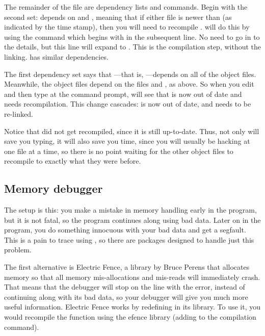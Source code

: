 \documentclass[12pt]{article}
\makeatletter
\def\ind#1{\index{#1}#1}
\def\cind#1{\index{#1@\ci{#1}}\ci{#1}}
\makeatother
\begin{document}
The remainder of the file are dependency lists and commands. Begin
with the second set:  depends on  and , meaning that if either file is newer than 
(as indicated by the time stamp), then you will need to recompile .  will do this by using the command which begins with
 in the subsequent line. No need to go in to the details, but
this line will expand to . This
is the compilation step, without the linking.  has similar
dependencies.

The first dependency set says that ---that is, ---depends on all of the object files. Meanwhile, the object files
depend on the  files and , as above. So when
you edit  and then type  at the command prompt,
 will see that  is now out of date and needs
recompilation. This change cascades:  is now out of date,
and needs to be re-linked.

Notice that  did not get recompiled, since it is still
up-to-date. Thus, not only will  save you typing, it will also
save you time, since you will usually be hacking at one file at a time,
so there is no point waiting for the other object files to recompile
to exactly what they were before. 

\subsection{Memory debugger}  

The setup is this: you make a mistake in memory handling early in the
program, but it is not fatal, so the program continues along using bad
data. Later on in the program, you do something innocuous with your bad
data and get a segfault. This is a pain to trace using , so
there are packages designed to handle just this problem.

The first alternative is \ind{Electric Fence}, a
library by Bruce Perens that allocates memory so that all memory
mis-allocations and mis-reads will immediately crash.  That means that
the debugger will stop on the line with the error, instead of continuing
along with its bad data, so your debugger will give you much more useful
information.  Electric Fence works by redefining \cind{malloc} in 
its library. To use it, you would recompile the function
using the efence library (adding  to the compilation
command).
\end{document}
